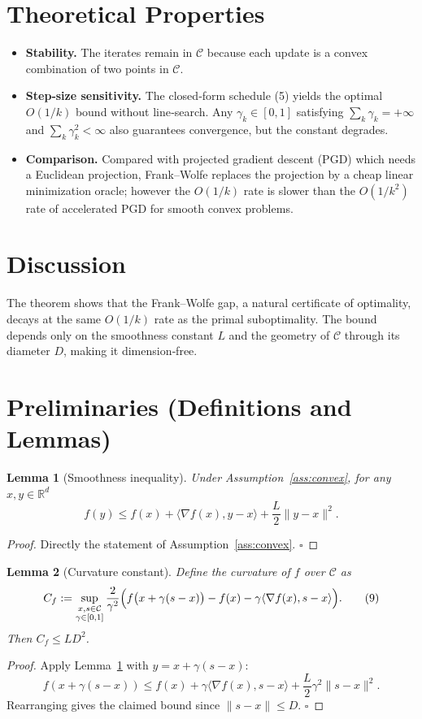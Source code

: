 \documentclass{article}
\newtheorem{lemma}{Lemma}
\newcommand{\ip}[2]{\langle #1,#2\rangle}
\newcommand{\R}{\mathbb{R}}
\begin{document}
\section*{Theoretical Properties}
\begin{itemize}
\item \textbf{Stability.} The iterates remain in $\mathcal{C}$ because each update is a convex combination of two points in $\mathcal{C}$.
\item \textbf{Step‑size sensitivity.} The closed‑form schedule (5) yields the optimal $O(1/k)$ bound without line‑search. Any $\gamma_{k}\in[0,1]$ satisfying $\sum_{k}\gamma_{k}=+\infty$ and $\sum_{k}\gamma_{k}^{2}<\infty$ also guarantees convergence, but the constant degrades.
\item \textbf{Comparison.} Compared with projected gradient descent (PGD) which needs a Euclidean projection, Frank–Wolfe replaces the projection by a cheap linear minimization oracle; however the $O(1/k)$ rate is slower than the $O(1/k^{2})$ rate of accelerated PGD for smooth convex problems.
\end{itemize}

\section*{Discussion}
The theorem shows that the Frank–Wolfe gap, a natural certificate of optimality, decays at the same $O(1/k)$ rate as the primal suboptimality. The bound depends only on the smoothness constant $L$ and the geometry of $\mathcal{C}$ through its diameter $D$, making it dimension‑free.

\newpage
\section*{Preliminaries (Definitions and Lemmas)}
\begin{lemma}[Smoothness inequality]\label{lem:smooth}
Under Assumption~\ref{ass:convex}, for any $x,y\in\R^{d}$
\[
f(y)\le f(x)+\ip{\nabla f(x)}{y-x}+\frac{L}{2}\|y-x\|^{2}. \tag{8}
\]
\end{lemma}
\begin{proof}
Directly the statement of Assumption~\ref{ass:convex}. \hfill $\square$
\end{proof}

\begin{lemma}[Curvature constant]\label{lem:curv}
Define the curvature of $f$ over $\mathcal{C}$ as
\[
C_{f}:=\sup_{\substack{x,s\in\mathcal{C}\\\gamma\in[0,1]}}
\frac{2}{\gamma^{2}}\Bigl(f\bigl(x+\gamma(s-x)\bigr)-f(x)-\gamma\ip{\nabla f(x)}{s-x}\Bigr).
\tag{9}
\]
Then $C_{f}\le L D^{2}$. 
\end{lemma}
\begin{proof}
Apply Lemma~\ref{lem:smooth} with $y=x+\gamma(s-x)$:
\[
f(x+\gamma(s-x))\le f(x)+\gamma\ip{\nabla f(x)}{s-x}
                    +\frac{L}{2}\gamma^{2}\|s-x\|^{2}.
\]
Rearranging gives the claimed bound since $\|s-x\|\le D$. \hfill $\square$
\end{proof}
\end{document}
